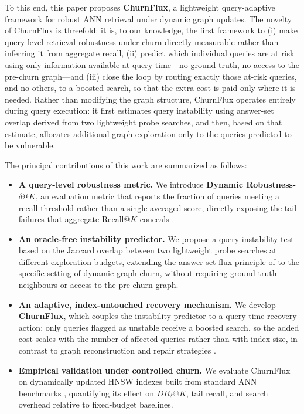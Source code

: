 \documentclass{ieeeaccess}
\begin{document}
To this end, this paper proposes \textbf{ChurnFlux}, a lightweight query-adaptive framework for robust ANN retrieval under dynamic graph updates. The novelty of ChurnFlux is threefold: it is, to our knowledge, the first framework to (i) make query-level retrieval robustness under churn directly measurable rather than inferring it from aggregate recall, (ii) predict which individual queries are at risk using only information available at query time---no ground truth, no access to the pre-churn graph---and (iii) close the loop by routing exactly those at-risk queries, and no others, to a boosted search, so that the extra cost is paid only where it is needed. Rather than modifying the graph structure, ChurnFlux operates entirely during query execution: it first estimates query instability using answer-set overlap derived from two lightweight probe searches, and then, based on that estimate, allocates additional graph exploration only to the queries predicted to be vulnerable.

The principal contributions of this work are summarized as follows:
\begin{itemize}
  \item \textbf{A query-level robustness metric.} We introduce \textbf{Dynamic Robustness-$\delta@K$}, an evaluation metric that reports the fraction of queries meeting a recall threshold rather than a single averaged score, directly exposing the tail failures that aggregate Recall@$K$ conceals \cite{Robust2025}.
  \item \textbf{An oracle-free instability predictor.} We propose a query instability test based on the Jaccard overlap between two lightweight probe searches at different exploration budgets, extending the answer-set flux principle of \cite{Sheaf2026} to the specific setting of dynamic graph churn, without requiring ground-truth neighbours or access to the pre-churn graph.
  \item \textbf{An adaptive, index-untouched recovery mechanism.} We develop \textbf{ChurnFlux}, which couples the instability predictor to a query-time recovery action: only queries flagged as unstable receive a boosted search, so the added cost scales with the number of affected queries rather than with index size, in contrast to graph reconstruction and repair strategies \cite{Mandarapu2026}.
  \item \textbf{Empirical validation under controlled churn.} We evaluate ChurnFlux on dynamically updated HNSW indexes built from standard ANN benchmarks \cite{ANNBenchmarks2020, ANNBenchmarks2022}, quantifying its effect on $DR_{\delta}@K$, tail recall, and search overhead relative to fixed-budget baselines.
\end{itemize}
\end{document}
